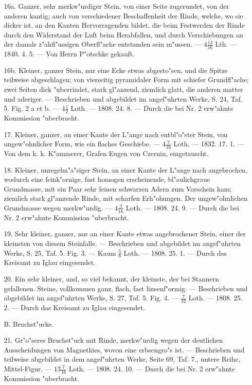 \documentclass[a4paper, 11pt, oneside, polutonikogreek, german]{article}
\begin{document}
16a. Ganzer, sehr merkw"urdiger Stein, von einer Seite zugerundet, von der anderen kantig; auch von verschiedener Beschaffenheit der Rinde, welche, wo sie dicker ist, an den Kanten Hervorragenden bildet, die beim Festwerden der Rinde durch den Widerstand der Luft beim Herabfallen, und durch Verschiebungen an der damals z"ahfl"ussigen Oberfl"ache entstanden sein m"ussen. --- $4\frac{13}{16}$ Lth. --- 1840. 4. 5. --- Von Herrn P"otschke gekauft. 

16b. Kleiner, ganzer Stein, nur eine Ecke etwas abgesto"sen, und die Spitze teilweise abgeschlagen; von vierseitig pyramidaler Form mit schiefer Grundfl"ache; zwei Seiten dick "uberrindet, stark gl"anzend, ziemlich glatt, die anderen matter und aderiger. --- Beschrieben und abgebildet im angef"uhrten Werke, S. 24, Taf. 5. Fig. 2 a et b. --- $4\frac{1}{2}$ Loth. --- 1808. 24. 8. --- Durch die bei Nr. 2 erw"ahnte Kommission "uberbracht.

17. Kleiner, ganzer, an einer Kante der L"ange nach entbl"o"ster Stein, von ungew"ohnlicher Form, wie ein flaches Geschiebe. --- $4\frac{7}{16}$ Loth. --- 1832. 17. 1. --- Von dem k. k. K"ammerer, Grafen Eugen von Czernin, eingetauscht.

18. Kleiner, unregelm"a"siger Stein, an einer Kante der L"ange nach angebrochen, wodurch eine feink"ornige, fast homogen erscheinende, bl"aulichgraue Grundmasse, mit ein Paar sehr feinen schwarzen Adern zum Vorschein kam; ziemlich stark gl"anzende Rinde, mit scharfen Erh"ohungen. Der ungew"ohnlichen Grundmasse wegen merkw"urdig. --- $4\frac{3}{16}$ Loth. --- 1808. 24. 9. --- Durch die bei Nr. 2 erw"ahnte Kommission "uberbracht.

19. Sehr kleiner, ganzer, nur an einer Kante etwas angebrochener Stein, einer der kleinsten von diesem Steinfalle. --- Beschrieben und abgebildet im angef"uhrten Werke, S. 25, Taf. 5. Fig. 3. --- Kaum $\frac{5}{8}$ Loth. --- 1808. 25. 1. --- Durch das Kreisamt zu Iglau eingesendet.

20. Ein sehr kleiner, und, so viel bekannt, der kleinste, der bei Stannern gefallenen. Steine, vollkommen ganz, flach, fast linsenf"ormig. --- Beschrieben und abgebildet im angef"uhrten Werke, S. 27, Taf. 5. Fig. 4. --- $\frac{7}{32}$ Loth. --- 1808. 25. 2. --- Durch das Kreisamt zu Iglau eingesendet.

B. Bruchst"ucke.

21. Gr"o"seres Bruchst"uck mit Rinde, merkw"urdig wegen der deutlichen Ausscheidungen von Magnetkies, wovon eine erbsengro"s ist. --- Beschrieben und teilweise abgebildet in dem angef"uhrten Werke, Seite 69, Taf. 7., untere Reihe, Mittel-Figur. --- $13\frac{7}{16}$ Loth. --- 1808. 24. 10. --- Durch die bei Nr. 2 erw"ahnte Kommission "uberbracht.
\end{document}
